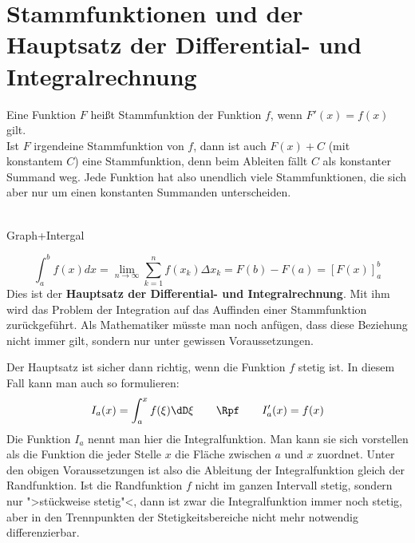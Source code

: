 \section{Stammfunktionen und der Hauptsatz der Differential- und Integralrechnung}
\begin{Definition}
  Eine Funktion $F$ heißt Stammfunktion der Funktion $f$, wenn $F'(x)=f(x)$
  gilt.\\
  Ist $F$ irgendeine Stammfunktion von $f$, dann ist auch $F(x)+C$ (mit
  konstantem $C$) eine Stammfunktion, denn beim Ableiten fällt $C$ als
  konstanter Summand weg. Jede Funktion hat also unendlich viele
  Stammfunktionen, die sich aber nur um einen konstanten Summanden
  unterscheiden.
\end{Definition}
\\Graph+Intergal

\begin{equation}
  \int_a^b f(x)d x
  =\lim_{n\to\infty}\sum_{k=1}^n f(x_k)\Delta x_k = F(b) - F(a)
  =\left[F(x)\right]_a^b
\end{equation}
Dies ist der \textbf{Hauptsatz der Differential- und Integralrechnung}. Mit
ihm wird das Problem der Integration auf das Auffinden einer Stammfunktion
zurückgeführt. Als Mathematiker müsste man noch anfügen, dass diese Beziehung
nicht immer gilt, sondern nur unter gewissen Voraussetzungen.

Der Hauptsatz ist sicher dann richtig, wenn die Funktion $f$ stetig ist.
In diesem Fall kann man auch so formulieren:
\[
I_a(x)=\int_a^x f(\xi)\dD \xi \qquad\Rpf\qquad I_a'(x)=f(x)
\]
Die Funktion $I_a$ nennt man hier die Integralfunktion. Man kann sie sich
vorstellen als die Funktion die jeder Stelle $x$ die Fläche zwischen $a$ und
$x$ zuordnet. Unter den obigen Voraussetzungen ist also die Ableitung der
Integralfunktion gleich der Randfunktion. Ist die Randfunktion $f$ nicht im
ganzen Intervall stetig, sondern nur ">stückweise stetig"<, dann ist zwar die
Integralfunktion immer noch stetig, aber in den Trennpunkten der
Stetigkeitsbereiche nicht mehr notwendig differenzierbar.

